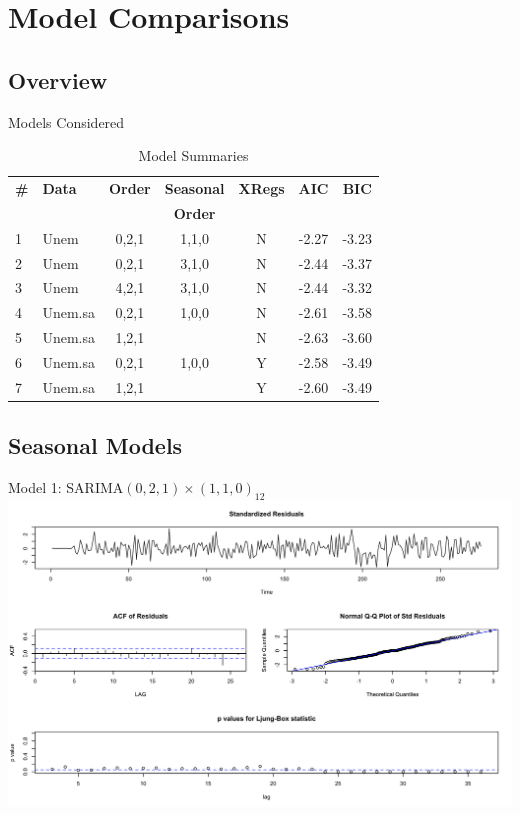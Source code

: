     \section{Model Comparisons}
    
    \subsection{Overview}
  \begin{frame}{Models Considered}
\begin{table}[H]
\centering
\caption{Model Summaries}
\begin{tabular}{llccccc}
  \hline
 \textbf{\#}& \textbf{Data}  & \textbf{Order} & \textbf{Seasonal} & \textbf{XRegs} & \textbf{AIC} & \textbf{BIC} \\
 &&&\textbf{Order}&&&\\ 
  \hline
1 & Unem  & 0,2,1 & 1,1,0 & N & -2.27 & -3.23 \\ 
  2 & Unem  & 0,2,1 & 3,1,0 & N & -2.44 & -3.37 \\ 
  3 & Unem  & 4,2,1 & 3,1,0 & N & -2.44 & -3.32 \\ 
  4 & Unem.sa & 0,2,1 & 1,0,0 & N & -2.61 & -3.58 \\ 
  5 & Unem.sa  & 1,2,1 &  & N & -2.63 & -3.60 \\ 
  6 & Unem.sa & 0,2,1 & 1,0,0 & Y & -2.58 & -3.49 \\ 
  7 & Unem.sa  & 1,2,1 &  & Y & -2.60 & -3.49 \\ 
   \hline
\end{tabular}
\label{tab:models}
\end{table}
  \end{frame}

 \subsection{Seasonal Models}
  \begin{frame}{Model 1: SARIMA\((0,2,1) \times (1,1,0)_{12}\)}
  		\includegraphics[width=\linewidth]{images/seasonalmodel1}
  \end{frame}

